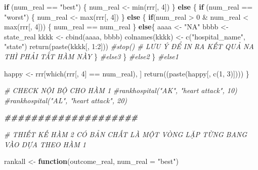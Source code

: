 \documentclass[
]{book}
\newenvironment{Shaded}{\begin{snugshade}}{\end{snugshade}}
\newcommand{\AttributeTok}[1]{\textcolor[rgb]{0.77,0.63,0.00}{#1}}
\newcommand{\CommentTok}[1]{\textcolor[rgb]{0.56,0.35,0.01}{\textit{#1}}}
\newcommand{\ControlFlowTok}[1]{\textcolor[rgb]{0.13,0.29,0.53}{\textbf{#1}}}
\newcommand{\DecValTok}[1]{\textcolor[rgb]{0.00,0.00,0.81}{#1}}
\newcommand{\DocumentationTok}[1]{\textcolor[rgb]{0.56,0.35,0.01}{\textbf{\textit{#1}}}}
\newcommand{\FunctionTok}[1]{\textcolor[rgb]{0.00,0.00,0.00}{#1}}
\newcommand{\NormalTok}[1]{#1}
\newcommand{\OtherTok}[1]{\textcolor[rgb]{0.56,0.35,0.01}{#1}}
\newcommand{\SpecialCharTok}[1]{\textcolor[rgb]{0.00,0.00,0.00}{#1}}
\newcommand{\StringTok}[1]{\textcolor[rgb]{0.31,0.60,0.02}{#1}}
\theoremstyle{definition}
\theoremstyle{definition}
\theoremstyle{definition}
\theoremstyle{definition}
\theoremstyle{remark}
\begin{document}
\begin{Shaded}
\begin{Highlighting}[]
  \ControlFlowTok{if}\NormalTok{ (num\_real }\SpecialCharTok{==} \StringTok{"best"}\NormalTok{) \{}
\NormalTok{    num\_real }\OtherTok{\textless{}{-}} \FunctionTok{min}\NormalTok{(rrr[, }\DecValTok{4}\NormalTok{])}
\NormalTok{  \} }\ControlFlowTok{else}\NormalTok{ \{}
    \ControlFlowTok{if}\NormalTok{ (num\_real }\SpecialCharTok{==} \StringTok{"worst"}\NormalTok{)  \{}
\NormalTok{      num\_real }\OtherTok{\textless{}{-}} \FunctionTok{max}\NormalTok{(rrr[, }\DecValTok{4}\NormalTok{])}
\NormalTok{    \} }\ControlFlowTok{else}\NormalTok{ \{}
      \ControlFlowTok{if}\NormalTok{(num\_real }\SpecialCharTok{\textgreater{}} \DecValTok{0} \SpecialCharTok{\&}\NormalTok{ num\_real }\SpecialCharTok{\textless{}} \FunctionTok{max}\NormalTok{(rrr[, }\DecValTok{4}\NormalTok{]))  \{}
\NormalTok{        num\_real }\SpecialCharTok{==}\NormalTok{ num\_real}
\NormalTok{      \}}
      \ControlFlowTok{else}\NormalTok{\{}
\NormalTok{        aaaa }\OtherTok{\textless{}{-}} \StringTok{"NA"}
\NormalTok{        bbbb }\OtherTok{\textless{}{-}}\NormalTok{ state\_real}
\NormalTok{        kkkk }\OtherTok{\textless{}{-}} \FunctionTok{cbind}\NormalTok{(aaaa, bbbb)}
        \FunctionTok{colnames}\NormalTok{(kkkk) }\OtherTok{\textless{}{-}} \FunctionTok{c}\NormalTok{(}\StringTok{"hospital\_name"}\NormalTok{, }\StringTok{"state"}\NormalTok{)}
        \FunctionTok{return}\NormalTok{(}\FunctionTok{paste}\NormalTok{(kkkk[, }\DecValTok{1}\SpecialCharTok{:}\DecValTok{2}\NormalTok{]))}
        \CommentTok{\#stop() \# LƯU Ý ĐỂ IN RA KẾT QUẢ NA THÌ PHẢI TẮT HÀM NÀY}
\NormalTok{      \} }\CommentTok{\#else3 }
\NormalTok{    \} }\CommentTok{\#else2 }
\NormalTok{  \} }\CommentTok{\#else1}
  
\NormalTok{  happy }\OtherTok{\textless{}{-}}\NormalTok{ rrr[}\FunctionTok{which}\NormalTok{(rrr[, }\DecValTok{4}\NormalTok{] }\SpecialCharTok{==}\NormalTok{ num\_real), ]}
  \FunctionTok{return}\NormalTok{((}\FunctionTok{paste}\NormalTok{(happy[, }\FunctionTok{c}\NormalTok{(}\DecValTok{1}\NormalTok{, }\DecValTok{3}\NormalTok{)])))}
\NormalTok{\}}

\CommentTok{\# CHECK NỘI BỘ CHO HÀM 1}
\CommentTok{\#rankhospital("AK", "heart attack", 10)}
\CommentTok{\#rankhospital("AL", "heart attack", 20)}

\DocumentationTok{\#\#\#\#\#\#\#\#\#\#\#\#\#\#\#\#\#\#\#\#}

\CommentTok{\# THIẾT KẾ HÀM 2 CÓ BẢN CHẤT LÀ MỘT VÒNG LẶP TỪNG BANG VÀO DỰA THEO HÀM 1}

\NormalTok{rankall }\OtherTok{\textless{}{-}} \ControlFlowTok{function}\NormalTok{(outcome\_real, }\AttributeTok{num\_real =} \StringTok{"best"}\NormalTok{)}
  

\end{Highlighting}
\end{Shaded}
\end{document}
